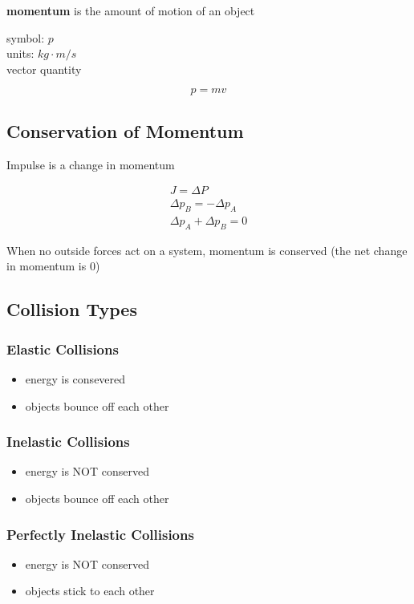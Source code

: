 \documentclass[titlepage]{article}
\begin{document}
\textbf{momentum} is the amount of motion of an object

symbol: $p$\\
units: $kg \cdot m/s$\\
vector quantity

\begin{equation*}
    p = mv
\end{equation*}

\subsection{Conservation of Momentum}
Impulse is a change in momentum

\begin{align*}
    J = \Delta P \\ 
    \Delta p_B = -\Delta p_A \\
    \Delta p_A + \Delta p_B = 0
\end{align*}

When no outside forces act on a system, momentum is conserved (the net change in momentum is 0)

\subsection{Collision Types}
\subsubsection{Elastic Collisions}
\begin{itemize}
    \item energy is consevered
    \item objects bounce off each other
\end{itemize}

\subsubsection{Inelastic Collisions}
\begin{itemize}
    \item energy is NOT conserved
    \item objects bounce off each other
\end{itemize}

\subsubsection{Perfectly Inelastic Collisions}
\begin{itemize}
    \item energy is NOT conserved
    \item objects stick to each other
\end{itemize}
\end{document}
